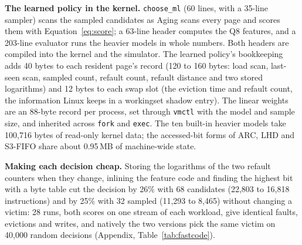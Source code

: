 \documentclass{article}
\newcommand{\finding}[1]{\textbf{#1}\hspace{0.4em}}
\begin{document}
\finding{The learned policy in the kernel.} \texttt{choose\_ml} (60 lines, with a 35-line
sampler) scans the sampled candidates as Aging scans every page and scores them with
Equation~\ref{eq:score}; a 63-line header computes the Q8 features, and a 203-line
evaluator runs the heavier models in whole numbers. Both headers are compiled into the
kernel and the simulator. The learned policy's bookkeeping adds 40 bytes to each
resident page's record (120 to 160 bytes: load scan, last-seen scan, sampled count,
refault count, refault distance and two stored logarithms) and 12 bytes to each swap slot
(the eviction time and refault count, the information Linux keeps in a workingset shadow
entry). The linear weights are an 88-byte record per process, set through \texttt{vmctl}
with the model and sample size, and inherited across \texttt{fork} and \texttt{exec}. The
ten built-in heavier models take 100,716 bytes of read-only kernel data; the accessed-bit
forms of ARC, LHD and S3-FIFO share about 0.95\,MB of machine-wide state.

\finding{Making each decision cheap.} Storing the logarithms of the two refault counters
when they change, inlining the feature code and finding the highest bit with a byte table
cut the decision by 26\% with 68 candidates (22,803 to 16,818 instructions) and by 25\% with
32 sampled (11,293 to 8,465) without changing a victim: 28 runs, both scores on one stream of
each workload, give identical faults, evictions and writes, and natively the two versions
pick the same victim on 40,000 random decisions (Appendix, Table~\ref{tab:fastcode}).
\end{document}
